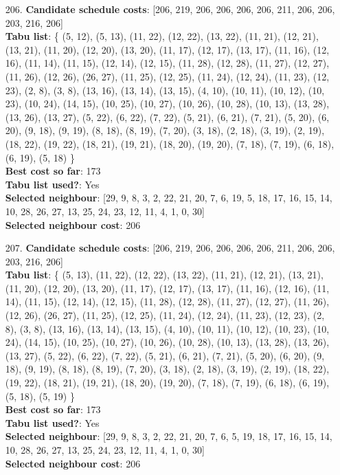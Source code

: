\documentclass[fleqn]{article}
\begin{document}
\begin{itemize}
    \item[206.] \textbf{Candidate schedule costs}: [206, 219, 206, 206, 206, 206, 211, 206, 206, 203, 216, 206] \\
    \textbf{Tabu list}: \{ (5, 12), (5, 13), (11, 22), (12, 22), (13, 22), (11, 21), (12, 21), (13, 21), (11, 20), (12, 20), (13, 20), (11, 17), (12, 17), (13, 17), (11, 16), (12, 16), (11, 14), (11, 15), (12, 14), (12, 15), (11, 28), (12, 28), (11, 27), (12, 27), (11, 26), (12, 26), (26, 27), (11, 25), (12, 25), (11, 24), (12, 24), (11, 23), (12, 23), (2, 8), (3, 8), (13, 16), (13, 14), (13, 15), (4, 10), (10, 11), (10, 12), (10, 23), (10, 24), (14, 15), (10, 25), (10, 27), (10, 26), (10, 28), (10, 13), (13, 28), (13, 26), (13, 27), (5, 22), (6, 22), (7, 22), (5, 21), (6, 21), (7, 21), (5, 20), (6, 20), (9, 18), (9, 19), (8, 18), (8, 19), (7, 20), (3, 18), (2, 18), (3, 19), (2, 19), (18, 22), (19, 22), (18, 21), (19, 21), (18, 20), (19, 20), (7, 18), (7, 19), (6, 18), (6, 19), (5, 18) \} \\
    \textbf{Best cost so far}: 173 \\
    \textbf{Tabu list used?}: Yes \\
    \textbf{Selected neighbour}: [29, 9, 8, 3, 2, 22, 21, 20, 7, 6, 19, 5, 18, 17, 16, 15, 14, 10, 28, 26, 27, 13, 25, 24, 23, 12, 11, 4, 1, 0, 30] \\
    \textbf{Selected neighbour cost}: 206
      

    \item[207.] \textbf{Candidate schedule costs}: [206, 219, 206, 206, 206, 206, 211, 206, 206, 203, 216, 206] \\
    \textbf{Tabu list}: \{ (5, 13), (11, 22), (12, 22), (13, 22), (11, 21), (12, 21), (13, 21), (11, 20), (12, 20), (13, 20), (11, 17), (12, 17), (13, 17), (11, 16), (12, 16), (11, 14), (11, 15), (12, 14), (12, 15), (11, 28), (12, 28), (11, 27), (12, 27), (11, 26), (12, 26), (26, 27), (11, 25), (12, 25), (11, 24), (12, 24), (11, 23), (12, 23), (2, 8), (3, 8), (13, 16), (13, 14), (13, 15), (4, 10), (10, 11), (10, 12), (10, 23), (10, 24), (14, 15), (10, 25), (10, 27), (10, 26), (10, 28), (10, 13), (13, 28), (13, 26), (13, 27), (5, 22), (6, 22), (7, 22), (5, 21), (6, 21), (7, 21), (5, 20), (6, 20), (9, 18), (9, 19), (8, 18), (8, 19), (7, 20), (3, 18), (2, 18), (3, 19), (2, 19), (18, 22), (19, 22), (18, 21), (19, 21), (18, 20), (19, 20), (7, 18), (7, 19), (6, 18), (6, 19), (5, 18), (5, 19) \} \\
    \textbf{Best cost so far}: 173 \\
    \textbf{Tabu list used?}: Yes \\
    \textbf{Selected neighbour}: [29, 9, 8, 3, 2, 22, 21, 20, 7, 6, 5, 19, 18, 17, 16, 15, 14, 10, 28, 26, 27, 13, 25, 24, 23, 12, 11, 4, 1, 0, 30] \\
    \textbf{Selected neighbour cost}: 206
      


\end{itemize}
\end{document}

